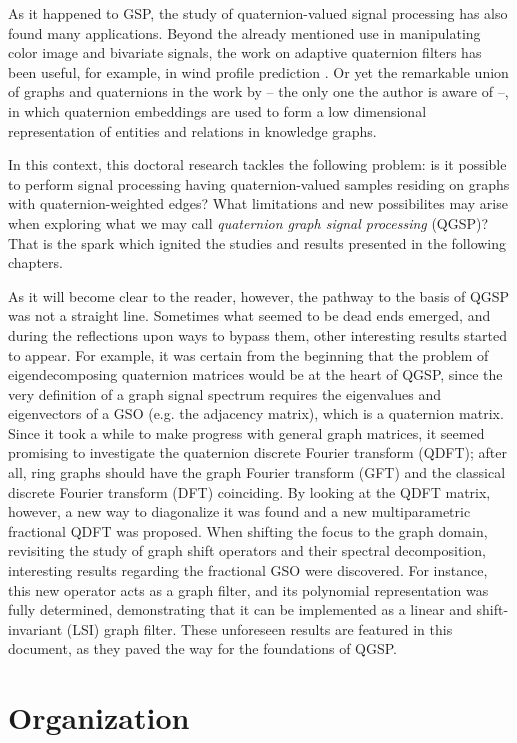 As it happened to GSP, the study of quaternion-valued signal processing has also found many applications. Beyond the already mentioned use in manipulating color image and bivariate signals, the work on adaptive quaternion filters has been useful, for example, in wind profile prediction \cite{jiang2014general}. Or yet the remarkable union of graphs and quaternions in the work by \cite{zhang2019quaternion} -- the only one the author is aware of --, in which quaternion embeddings are used to form a low dimensional representation of entities and relations in knowledge graphs.

In this context, this doctoral research tackles the following problem: is it possible to perform signal processing having quaternion-valued samples residing on graphs with quaternion-weighted edges? What limitations and new possibilites may arise when exploring what we may call \textit{quaternion graph signal processing} (QGSP)? That is the spark which ignited the studies and results presented in the following chapters.

As it will become clear to the reader, however, the pathway to the basis of QGSP was not a straight line. Sometimes what seemed to be dead ends emerged, and during the reflections upon ways to bypass them, other interesting results started to appear. For example, it was certain from the beginning that the problem of eigendecomposing quaternion matrices would be at the heart of QGSP, since the very definition of a graph signal spectrum requires the eigenvalues and eigenvectors of a GSO (e.g. the adjacency matrix), which is a quaternion matrix. Since it took a while to make progress with general graph matrices, it seemed promising to investigate the quaternion discrete Fourier transform (QDFT); after all, ring graphs should have the graph Fourier transform (GFT) and the classical discrete Fourier transform (DFT) coinciding. By looking at the QDFT matrix, however, a new way to diagonalize it was found and a new multiparametric fractional QDFT was proposed. When shifting the focus to the graph domain, revisiting the study of graph shift operators and their spectral decomposition, interesting results regarding the fractional GSO were discovered. For instance, this new operator acts as a graph filter, and its polynomial representation was fully determined, demonstrating that it can be implemented as a linear and shift-invariant (LSI) graph filter. These unforeseen results are featured in this document, as they paved the way for the foundations of QGSP.

\section{Organization}

